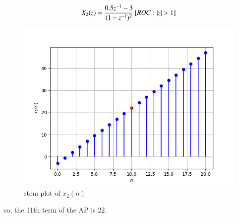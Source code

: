 \documentclass[journal,12pt,twocolumn]{IEEEtran}
\theoremstyle{remark}
\begin{document}
\begin{enumerate}
\begin{align}
X_2(z) = \frac{0.5z^{-1}-3}{(1-z^{-1})^2} {}\left[ROC : |z| > 1\right]
\end{align}


\begin{figure}[h!]
    \centering
    \includegraphics[width=\columnwidth]{figs/plot2.png}
    \caption{stem plot of $x_2(n)$}
    \label{fig:2}
\end{figure}
so, the 11th term of the AP is $22$.
\end{enumerate}
\end{document}
